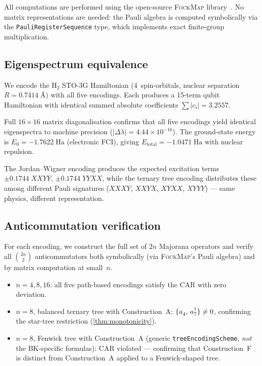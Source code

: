 %

All computations are performed using the open-source \textsc{FockMap}
library~\cite{fockmap2026}.  No matrix representations are needed:
the Pauli algebra is computed symbolically via the \texttt{PauliRegister\-Sequence}
type, which implements exact finite-group multiplication.

\subsection{Eigenspectrum equivalence}
\label{sec:val-eigen}

We encode the H$_2$ STO-3G Hamiltonian (4~spin-orbitals, nuclear
separation $R = 0.7414\;\text{\AA}$) with all five encodings.  Each
produces a 15-term qubit Hamiltonian with identical summed absolute
coefficients $\sum |c_i| = 3.2557$.

Full $16 \times 16$ matrix diagonalisation confirms that all five
encodings yield identical eigenspectra to machine precision
($|\Delta\lambda| = 4.44 \times 10^{-16}$).  The ground-state energy
is $E_0 = -1.7622\;\text{Ha}$ (electronic FCI), giving
$E_\text{total} = -1.0471\;\text{Ha}$ with nuclear repulsion.

The Jordan--Wigner encoding produces the expected excitation terms
$\pm 0.1744\; XXYY$, $\pm 0.1744\; YYXX$, while the ternary tree
encoding distributes these among different Pauli signatures ($XXXY$,
$XXYX$, $XYXX$, $XYYY$) — same physics, different representation.

\subsection{Anticommutation verification}
\label{sec:val-car}

For each encoding, we construct the full set of $2n$ Majorana operators
and verify all $\binom{2n}{2}$ anticommutators both symbolically (via
\textsc{FockMap}'s Pauli algebra) and by matrix computation at
small~$n$.

\begin{itemize}
  \item $n = 4, 8, 16$: all five path-based encodings satisfy the CAR
    with zero deviation.
  \item $n = 8$, balanced ternary tree with Construction~A:
    $\acomm{\an{4}}{\ad{7}} \neq 0$, confirming the star-tree
    restriction (\cref{thm:monotonicity}).
  \item $n = 8$, Fenwick tree with Construction~A (generic
    \texttt{treeEncodingScheme}, \emph{not} the BK-specific formulas):
    CAR violated --- confirming that Construction~F is distinct from
    Construction~A applied to a Fenwick-shaped tree.
\end{itemize}


